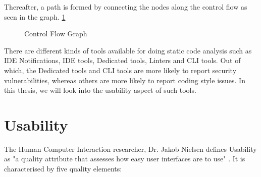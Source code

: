 Thereafter, a path is formed by connecting the nodes along the control flow as seen in the graph. \ref{fig:CFG} \\

\begin{figure}
\centering


\caption{Control Flow Graph}
\label{fig:CFG}
\end{figure} 


There are different kinds of tools available for doing static code analysis such as IDE Notifications, IDE tools, Dedicated tools, Linters and CLI tools. Out of which, the Dedicated tools and CLI tools are more likely to report security vulnerabilities, whereas others are more likely to report coding style issues. In this thesis, we will look into the usability aspect of such tools. 


\section{Usability}

The Human Computer Interaction researcher, Dr. Jakob Nielsen defines Usability as "a quality attribute that assesses how easy user interfaces are to use" \cite{usability-define}. It is characterised by five quality elements:

